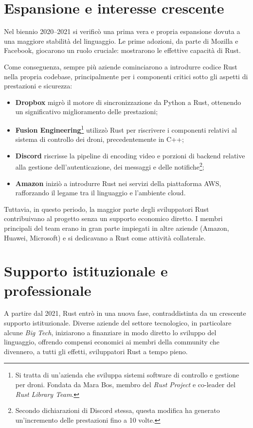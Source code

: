 \section{Espansione e interesse crescente}
Nel biennio 2020--2021 si verificò una prima vera e propria espansione dovuta a una maggiore stabilità del linguaggio. Le prime adozioni, 
da parte di Mozilla e Facebook, giocarono un ruolo cruciale: mostrarono le effettive capacità di Rust.

Come conseguenza, sempre più aziende cominciarono a introdurre codice Rust nella propria codebase, principalmente per i componenti critici sotto 
gli aspetti di prestazioni e sicurezza:
\begin{itemize}
    \item \textbf{Dropbox} migrò il motore di sincronizzazione da Python a Rust, ottenendo un significativo miglioramento delle prestazioni;
    \item \textbf{Fusion Engineering}\footnote{Si tratta di un'azienda che sviluppa sistemi software di controllo e gestione per droni. Fondata da Mara Bos, membro del \textit{Rust Project} e co-leader del \textit{Rust Library Team}.} utilizzò Rust per riscrivere i componenti relativi al sistema di controllo dei droni, precedentemente in C++;
    \item \textbf{Discord} riscrisse la pipeline di encoding video e porzioni di backend relative alla gestione dell'autenticazione, dei messaggi e delle notifiche\footnote{Secondo dichiarazioni di Discord stessa, questa modifica ha generato un'incremento delle prestazioni fino a 10 volte.};
    \item \textbf{Amazon} iniziò a introdurre Rust nei servizi della piattaforma AWS, rafforzando il legame tra il linguaggio e l'ambiente cloud.
\end{itemize}
Tuttavia, in questo periodo, la maggior parte degli sviluppatori Rust contribuivano al progetto senza un supporto economico diretto.
I membri principali del team erano in gran parte impiegati in altre aziende (Amazon, Huawei, Microsoft) e si dedicavano a Rust come attività collaterale.

\section{Supporto istituzionale e professionale}
A partire dal 2021, Rust entrò in una nuova fase, contraddistinta da un crescente supporto istituzionale. Diverse aziende del settore 
tecnologico, in particolare alcune \textit{Big Tech}, iniziarono a finanziare in modo diretto lo sviluppo del linguaggio, offrendo compensi 
economici ai membri della community che divennero, a tutti gli effetti, sviluppatori Rust a tempo pieno.

